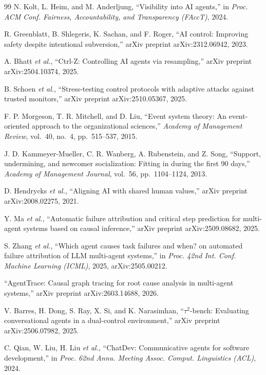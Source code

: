 \documentclass[conference]{IEEEtran}
\begin{document}
\begin{thebibliography}{99}
N. Kolt, L. Heim, and M. Anderljung, ``Visibility into AI agents,'' in
\emph{Proc. ACM Conf. Fairness, Accountability, and Transparency (FAccT)}, 2024.

R. Greenblatt, B. Shlegeris, K. Sachan, and F. Roger, ``AI control: Improving
safety despite intentional subversion,'' arXiv preprint arXiv:2312.06942, 2023.

A. Bhatt \emph{et al.}, ``Ctrl-Z: Controlling AI agents via resampling,'' arXiv
preprint arXiv:2504.10374, 2025.

B. Schoen \emph{et al.}, ``Stress-testing control protocols with adaptive
attacks against trusted monitors,'' arXiv preprint arXiv:2510.05367, 2025.

F. P. Morgeson, T. R. Mitchell, and D. Liu, ``Event system theory: An
event-oriented approach to the organizational sciences,'' \emph{Academy of
Management Review}, vol.~40, no.~4, pp.~515--537, 2015.

J. D. Kammeyer-Mueller, C. R. Wanberg, A. Rubenstein, and Z. Song, ``Support,
undermining, and newcomer socialization: Fitting in during the first 90 days,''
\emph{Academy of Management Journal}, vol.~56, pp.~1104--1124, 2013.

D. Hendrycks \emph{et al.}, ``Aligning AI with shared human values,'' arXiv
preprint arXiv:2008.02275, 2021.

Y. Ma \emph{et al.}, ``Automatic failure attribution and critical step
prediction for multi-agent systems based on causal inference,'' arXiv preprint
arXiv:2509.08682, 2025.

S. Zhang \emph{et al.}, ``Which agent causes task failures and when? on
automated failure attribution of LLM multi-agent systems,'' in \emph{Proc. 42nd
Int. Conf. Machine Learning (ICML)}, 2025, arXiv:2505.00212.

``AgentTrace: Causal graph tracing for root cause analysis in multi-agent
systems,'' arXiv preprint arXiv:2603.14688, 2026.

V. Barres, H. Dong, S. Ray, X. Si, and K. Narasimhan, ``$\tau^2$-bench:
Evaluating conversational agents in a dual-control environment,'' arXiv
preprint arXiv:2506.07982, 2025.

C. Qian, W. Liu, H. Liu \emph{et al.}, ``ChatDev: Communicative agents for
software development,'' in \emph{Proc. 62nd Annu. Meeting Assoc. Comput.
Linguistics (ACL)}, 2024.


\end{thebibliography}
\end{document}
